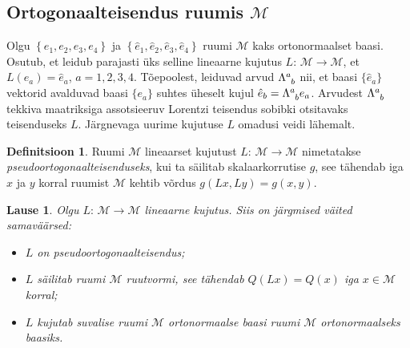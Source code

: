 \documentclass[12pt,a4paper,oneside]{article}
\theoremstyle{plain}
\newtheorem{lause}{Lause}[section]
\theoremstyle{definition}
\newtheorem{definitsioon}{Definitsioon}[section]
\numberwithin{equation}{section}
\def\M{{\mathcal M}}
\begin{document}
\subsection{Ortogonaalteisendus ruumis $\M$}

Olgu $\left\lbrace e_1, e_2, e_3, e_4 \right\rbrace$ ja 
$\left\lbrace \hat{e}_1, \hat{e}_2, \hat{e}_3, \hat{e}_4 
\right\rbrace$ ruumi $\M$ kaks ortonormaalset baasi. Osutub, et 
leidub parajasti üks selline lineaarne kujutus 
$L \colon\, \M \rightarrow \M$, et $L\left(e_a\right) = \hat{e}_a$, 
$a = 1, 2, 3, 4$. Tõepoolest, leiduvad arvud $\Lambda\indices{^a_b}$ 
nii, et baasi $\{\hat{e}_a\}$ vektorid avalduvad baasi $\{e_a\}$ 
suhtes üheselt kujul $\hat{e}_b = \Lambda\indices{^a_b} e_a$. 
Arvudest $\Lambda\indices{^a_b}$ tekkiva maatriksiga assotsieeruv 
Lorentzi teisendus sobibki otsitavaks teisenduseks $L$. Järgnevaga 
uurime kujutuse $L$ omadusi veidi lähemalt.

\begin{definitsioon}
Ruumi $\M$ lineaarset kujutust $L \colon\, \M \rightarrow \M$ nimetatakse 
\emph{pseu\-do\-ortogonaalteisenduseks}, kui ta säilitab 
skalaarkorrutise $g$, see tähendab iga $x$ ja $y$ korral ruumist 
$\M$ kehtib võrdus $g \left(Lx, Ly \right) = g \left(x, y\right)$.
\end{definitsioon}

\begin{lause} \label{lause:ortogonaalteisendus}
Olgu $L \colon\, \M \rightarrow \M$ lineaarne kujutus. Siis on järgmised 
väited sama\-väärsed:
\begin{itemize}
\item[\emph{(i)}] $L$ on pseudoortogonaalteisendus;
\item[\emph{(ii)}] $L$ säilitab ruumi $\M$ ruutvormi, see tähendab 
$Q\left(Lx\right) = Q\left(x\right)$ iga $x \in \M$ korral;
\item[\emph{(iii)}] $L$ kujutab suvalise ruumi $\M$ ortonormaalse baasi 
ruumi $\M$ ortonormaalseks baasiks.
\end{itemize}
\end{lause} 
\end{document}

